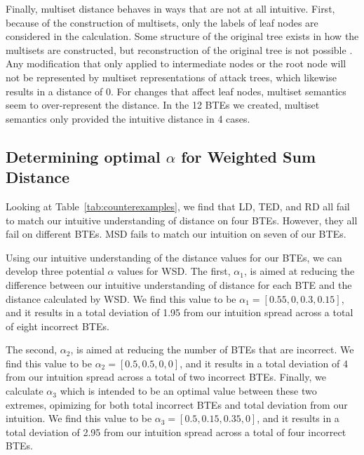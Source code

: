Finally, multiset distance behaves in ways that are not at all intuitive. First, because of the construction of multisets, only the labels of leaf nodes are considered in the calculation. Some structure of the original tree exists in how the multisets are constructed, but reconstruction of the original tree is not possible \cite{mauw_foundations_2006}. Any modification that only applied to intermediate nodes or the root node will not be represented by multiset representations of attack trees, which likewise results in a distance of 0. For changes that affect leaf nodes, multiset semantics seem to over-represent the distance. In the 12 BTEs we created, multiset semantics only provided the intuitive distance in 4 cases.

\subsection{Determining optimal $\alpha$ for Weighted Sum Distance}
\label{ssec:results-alpha}


Looking at Table~\ref{tab:counterexamples}, we find that LD, TED, and RD all fail to match our intuitive understanding of distance on four BTEs. However, they all fail on different BTEs. MSD fails to match our intuition on seven of our BTEs.

Using our intuitive understanding of the distance values for our BTEs, we can develop three potential $\alpha$ values for WSD. The first, $\alpha_1$, is aimed at reducing the difference between our intuitive understanding of distance for each BTE and the distance calculated by WSD. We find this value to be $\alpha_1=[0.55, 0, 0.3, 0.15]$, and it results in a total deviation of 1.95 from our intuition spread across a total of eight incorrect BTEs.

The second, $\alpha_2$, is aimed at reducing the number of BTEs that are incorrect. We find this value to be $\alpha_2=[0.5,0.5,0,0]$, and it results in a total deviation of 4 from our intuition spread across a total of two incorrect BTEs. Finally, we calculate $\alpha_3$ which is intended to be an optimal value between these two extremes, opimizing for both total incorrect BTEs and total deviation from our intuition. We find this value to be $\alpha_3=[0.5, 0.15, 0.35, 0]$, and it results in a total deviation of 2.95 from our intuition spread across a total of four incorrect BTEs.

